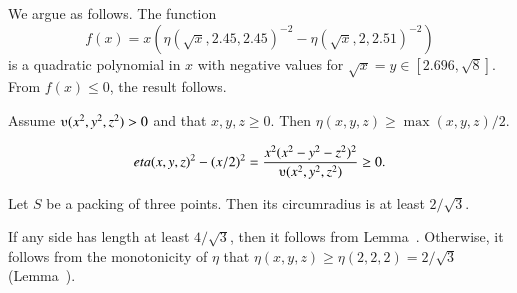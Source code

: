 \begin{tarskidata}
\begin{tarski}
\begin{proved}
We argue as follows. The function
  $$f(x) = x(\eta(\sqrt{x},2.45,2.45)^{-2}-\eta(\sqrt{x},2,2.51)^{-2})
  $$
is a quadratic
polynomial in $x$ with negative values for
$\sqrt{x}=y\in[2.696,\sqrt{8}]$. From $f(x)\le 0$, the result follows.
\swallowed\end{proved}
\end{tarski}





\begin{tarski}

\begin{lemma}
Assume $\ups(x^2,y^2,z^2)>0$ and that $x,y,z\ge0$.  Then
$\eta(x,y,z)\ge \max(x,y,z)/2$.
\end{lemma}

\begin{proved} 
  $$\eta(x,y,z)^2 - (x/2)^2 =
  \frac{x^2 (x^2-y^2-z^2)^2}{\ups(x^2,y^2,z^2)} \ge0.
  $$
\swallowed\end{proved}
\end{tarski}





\begin{tarski}

\begin{lemma}
Let $S$ be a packing of three points.
 Then its circumradius is at least $2/\sqrt3$.
\end{lemma}

\begin{proved} If any side has length at least $4/\sqrt3$, then
it follows from Lemma~.  Otherwise, it
follows from the monotonicity of $\eta$ that
$\eta(x,y,z)\ge \eta(2,2,2) = 2/\sqrt3$ (Lemma~).
\swallowed\end{proved}
\end{tarski}




\begin{tarski}


\end{tarski}
\end{tarskidata}
